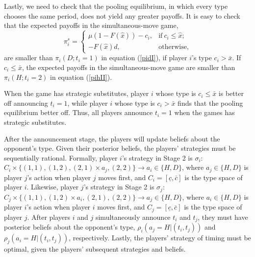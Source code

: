 \documentclass[12pt,english]{article}
\begin{document}
Lastly, we need to check that the pooling equilibrium, in which every type chooses the same period, does not yield any greater payoffs. It is easy to check that the expected payoffs in the simultaneous-move game, 
\begin{equation}
   \pi^s_{i} = 
   \begin{cases}
    \mu (1-F(\hat{x}))-c_{i}, &  \text{if} \  c_{i}\leq \hat{x};\\
    -F(\hat{x})d, & \text{otherwise}, 
   \end{cases}
   \label{pi_oneshot}
\end{equation}
are smaller than $\pi_i(D;t_i=1)$ in equation (\ref{pidI}), if player $i$'s type $c_i>\bar{x}$. If $c_i\leq \bar{x}$, the expected payoffs in the simultaneous-move game are smaller than $\pi_i(H;t_i=2)$ in equation (\ref{pihII}).\par
When the game has strategic substitutes, player $i$ whose type is $c_i\leq\bar{x}$ is better off announcing $t_i=1$, while player $i$ whose type is $c_i>\bar{x}$ finds that the pooling equilibrium better off. Thus, all players announce $t_i=1$ when the games has strategic substitutes.\par
After the announcement stage, the players will update beliefs about the opponent's type.  Given their posterior beliefs, the players' strategies must be sequentially rational. Formally, player $i$'s strategy in Stage 2 is $\sigma_i$: $C_i \times \{(1,1), (1,2), (2,1) \times a_j, (2,2)\} \rightarrow a_i \in\{H,D\}$, where $a_j \in \{H,D\}$ is player $j$'s action when player $j$ moves first, and $C_i = [\underline{c}, \bar{c}]$ is the type space of player $i$. Likewise, player $j$'s strategy in Stage 2 is $\sigma_j$: $C_j \times \{(1,1), (1,2) \times a_i, (2,1), (2,2)\} \rightarrow a_j \in\{H,D\}$, where $a_i \in \{H,D\}$ is player $i$'s action when player $i$ moves first, and $C_j = [\underline{c}, \bar{c}]$ is the type space of player $j$. After players $i$ and $j$ simultaneously announce $t_i$ and $t_j$, they must have posterior beliefs about the opponent's type, $\rho_i(a_j=H|(t_i,t_j))$ and $\rho_j(a_i=H|(t_i,t_j))$, respectively. Lastly, the players' strategy of timing must be optimal, given the players' subsequent strategies and beliefs.  \par 
\end{document}
